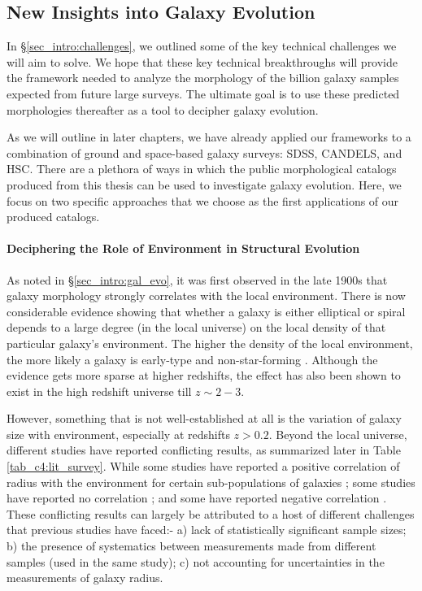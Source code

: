 \subsection{New Insights into Galaxy Evolution} \label{sec_intro:gal_evo_opportunities}

In \S \ref{sec_intro:challenges}, we outlined some of the key technical challenges we will aim to solve. We hope that these key technical breakthroughs will provide the framework needed to analyze the morphology of the billion galaxy samples expected from future large surveys. The ultimate goal is to use these predicted morphologies thereafter as a tool to decipher galaxy evolution. 

As we will outline in later chapters, we have already applied our frameworks to a combination of ground and space-based galaxy surveys: SDSS, CANDELS, and HSC. There are a plethora of ways in which the public morphological catalogs produced from this thesis can be used to investigate galaxy evolution. Here, we focus on two specific approaches that we choose as the first applications of our produced catalogs. 

\paragraph{Deciphering the Role of Environment in Structural Evolution} As noted in \S \ref{sec_intro:gal_evo}, it was first observed in the late 1900s that galaxy morphology strongly correlates with the local environment. There is now considerable evidence showing that whether a galaxy is either elliptical or spiral depends to a large degree (in
the local universe) on the local density of that particular galaxy’s environment. The higher the density of the local environment, the more likely a galaxy is early-type and non-star-forming \citep[e.g.,][]{dressler_84, gomez_03, blanton_09}. Although the evidence gets more sparse at higher redshifts, the effect has also been shown to exist in the high redshift universe till $z\sim2-3$.

However, something that is not well-established at all is the variation of galaxy size with environment, especially at redshifts $z > 0.2$. Beyond the local universe, different studies have reported conflicting results, as summarized later in Table \ref{tab_c4:lit_survey}. While some studies have reported a positive correlation of radius with the environment for certain sub-populations of galaxies \citep[e.g.,][]{Cooper12,Lani13,Bassett13,Afonso19,Siudek22}; some studies have reported no correlation \citep[e.g.,][]{Huertas-Company13,Kelkar15,Gu21}; and some have reported negative correlation \citep[e.g.,][]{Matharu19,Chan18}. These conflicting results can largely be attributed to a host of different challenges that previous studies have faced:- a) lack of statistically significant sample sizes; b) the presence of systematics between measurements made from different samples (used in the same study);  c) not accounting for uncertainties in the measurements of galaxy radius. 


